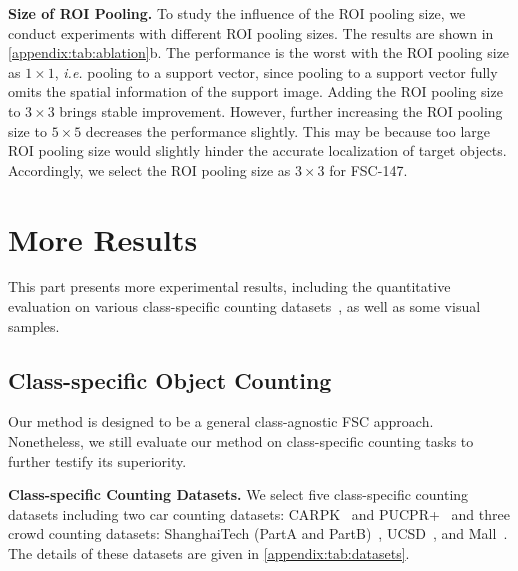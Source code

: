 \documentclass[10pt,twocolumn,letterpaper]{article}
\begin{document}
\vspace{2pt}\noindent\textbf{Size of ROI Pooling.} 
To study the influence of the ROI pooling size, we conduct experiments with different ROI pooling sizes. 
The results are shown in \cref{appendix:tab:ablation}b. 
The performance is the worst with the ROI pooling size as $1 \times 1$, \textit{i.e.} pooling to a support vector, since pooling to a support vector fully omits the spatial information of the support image.
Adding the ROI pooling size to $3 \times 3$ brings stable improvement. 
However, further increasing the ROI pooling size to $5 \times 5$ decreases the performance slightly. 
This may be because too large ROI pooling size would slightly hinder the accurate localization of target objects. 
Accordingly, we select the ROI pooling size as $3 \times 3$ for FSC-147. 

 \section{More Results}\label{appendix:sec:results}








This part presents more experimental results, including the quantitative evaluation on various class-specific counting datasets~\cite{lpn, ucsd, mall, mcnn}, as well as some visual samples.


\subsection{Class-specific Object Counting}

Our method is designed to be a general class-agnostic FSC approach. Nonetheless, we still evaluate our method on class-specific counting tasks to further testify its superiority. 

\vspace{2pt}\noindent \textbf{Class-specific Counting Datasets.} We select five class-specific counting datasets including two car counting datasets: CARPK~\cite{lpn} and PUCPR+~\cite{lpn} and three crowd counting datasets: ShanghaiTech (PartA and PartB)~\cite{mcnn}, UCSD~\cite{ucsd}, and Mall~\cite{mall}. The details of these datasets are given in \cref{appendix:tab:datasets}. 
\end{document}
